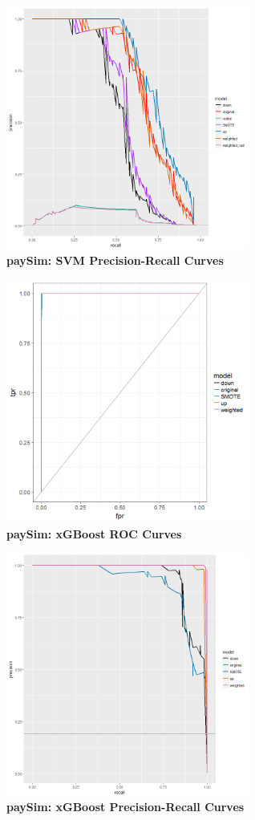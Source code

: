 \documentclass[12pt,]{article}
\begin{document}
\includegraphics[width=0.6\textwidth,height=\textheight]{figures/paysim/paySim_svm_PR.png}\\
\textbf{paySim: SVM Precision-Recall Curves}

\includegraphics[width=0.6\textwidth,height=\textheight]{figures/paysim/paySim_xgboost_rocs.png}\\
\textbf{paySim: xGBoost ROC Curves}

\includegraphics[width=0.6\textwidth,height=\textheight]{figures/paysim/paySim_xgboost_PR.png}\\
\textbf{paySim: xGBoost Precision-Recall Curves}
\end{document}
